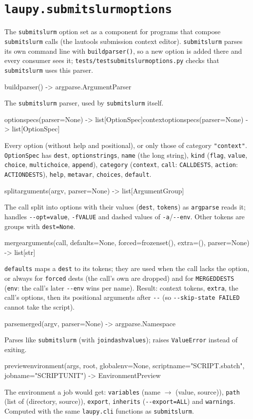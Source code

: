 \documentclass[11pt,a4paper]{article}
\newcommand{\api}[1]{%
  \par\medskip
  \begin{tcolorbox}[colback=sigbg, colframe=sigbg, boxrule=0pt, arc=1pt, left=4pt, right=4pt, top=2pt, bottom=2pt, breakable]
  \raggedright\ttfamily\small #1
  \end{tcolorbox}\nopagebreak\vspace{-4pt}%
}
\DeclareRobustCommand{\_}{\textunderscore\allowbreak}
\newcommand{\cmd}[1]{\texttt{#1}}
\begin{document}
\section{\texorpdfstring{\cmd{laupy.submitslurm\_options}}{laupy.submitslurm\_options}}

The \cmd{submitslurm} option set as a component for programs that compose \cmd{submitslurm} calls
(the lautools submission context editor). \cmd{submitslurm} parses its own command line with
\cmd{build\_parser()}, so a new option is added there and every consumer sees it;
\cmd{tests/test\_submitslurm\_options.py} checks that \cmd{submitslurm} uses this parser.

\api{build\_parser() -> argparse.ArgumentParser}
The \cmd{submitslurm} parser, used by \cmd{submitslurm} itself.

\api{option\_specs(parser=None) -> list[OptionSpec]\quad context\_option\_specs(parser=None) -> list[OptionSpec]}
Every option (without help and positional), or only those of category \cmd{"context"}.
\cmd{OptionSpec} has \cmd{dest}, \cmd{option\_strings}, \cmd{name} (the long string), \cmd{kind}
(\cmd{flag}, \cmd{value}, \cmd{choice}, \cmd{multi\_choice}, \cmd{append}), \cmd{category}
(\cmd{context}, \cmd{call}: \cmd{CALL\_DESTS}, \cmd{action}: \cmd{ACTION\_DESTS}), \cmd{help},
\cmd{metavar}, \cmd{choices}, \cmd{default}.

\api{split\_arguments(argv, parser=None) -> list[ArgumentGroup]}
The call split into options with their values (\cmd{dest}, \cmd{tokens}) as \cmd{argparse} reads it;
handles \cmd{-{}-opt=value}, \cmd{-fVALUE} and dashed values of \cmd{-a}/\cmd{-{}-env}. Other tokens are
groups with \cmd{dest=None}.

\api{merge\_arguments(call, defaults=None, forced=frozenset(), extra=(), parser=None) -> list[str]}
\cmd{defaults} maps a \cmd{dest} to its tokens; they are used when the call lacks the option, or
always for \cmd{forced} dests (the call's own are dropped) and for \cmd{MERGED\_DESTS} (\cmd{env}: the
call's later \cmd{-{}-env} wins per name). Result: context tokens, \cmd{extra}, the call's options,
then its positional arguments after \cmd{-{}-} (so \cmd{-{}-skip-state FAILED} cannot take the script).

\api{parse\_merged(argv, parser=None) -> argparse.Namespace}
Parses like \cmd{submitslurm} (with \cmd{join\_dash\_values}); raises \cmd{ValueError} instead of exiting.

\api{preview\_environment(args, root, global\_env=None, script\_name="SCRIPT.sbatch", job\_name="SCRIPT\_UNIT") -> EnvironmentPreview}
The environment a job would get: \cmd{variables} (name $\rightarrow$ (value, source)), \cmd{path}
(list of (directory, source)), \cmd{export}, \cmd{inherits} (\cmd{-{}-export=ALL}) and \cmd{warnings}.
Computed with the same \cmd{laupy.cli} functions as \cmd{submitslurm}.
\end{document}
